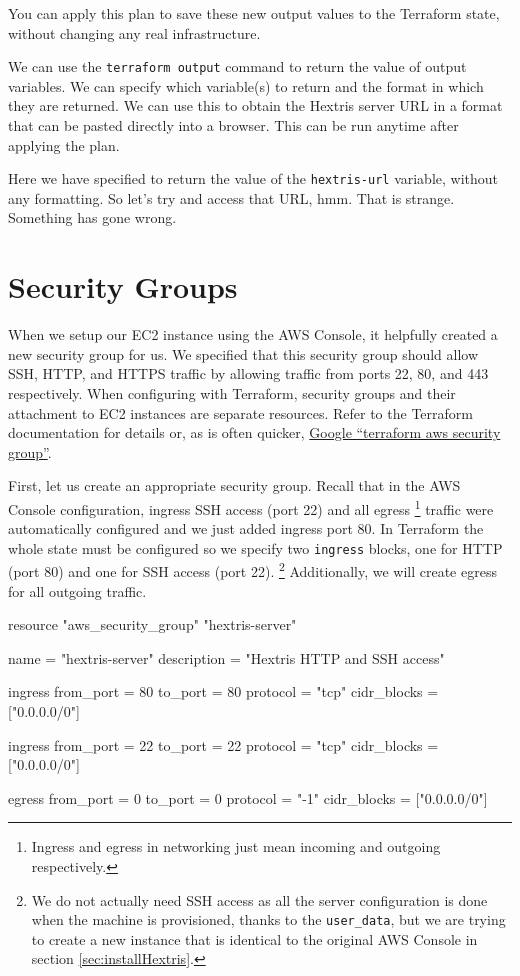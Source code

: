 \documentclass{csse4400}
\begin{document}
You can apply this plan to save these new output values to the Terraform state, without changing any real infrastructure.

We can use the \texttt{terraform output} command to return the value of output variables.
We can specify which variable(s) to return and the format in which they are returned.
We can use this to obtain the Hextris server URL in a format that can be pasted directly into a browser.
This can be run anytime after applying the plan.


Here we have specified to return the value of the \texttt{hextris-url} variable, without any formatting.
So let's try and access that URL, hmm.
That is strange. Something has gone wrong.


\section{Security Groups}
When we setup our EC2 instance using the AWS Console,
it helpfully created a new security group for us.
We specified that this security group should allow SSH, HTTP, and HTTPS traffic by allowing traffic from ports 22, 80, and 443 respectively.
When configuring with Terraform, security groups and their attachment to EC2 instances are separate resources.
Refer to the Terraform documentation for details or, as is often quicker,
\href{https://www.google.com/search?q=terraform+aws+security+group}{Google ``terraform aws security group''}.

First, let us create an appropriate security group.
Recall that in the AWS Console configuration,
ingress SSH access (port 22) and all egress%
\footnote{Ingress and egress in networking just mean incoming and outgoing respectively.}
traffic were automatically configured and we just added ingress port 80.
In Terraform the whole state must be configured so we specify two \texttt{ingress} blocks,
one for HTTP (port 80) and one for SSH access (port 22).%
\footnote{We do not actually need SSH access as all the server configuration is done when the machine is provisioned, thanks to the \texttt{user\_data},
but we are trying to create a new instance that is identical to the original AWS Console in section \ref{sec:installHextris}.}
Additionally, we will create egress for all outgoing traffic.

\begin{code}[language=terraform,numbers=none]{}
resource "aws_security_group" "hextris-server" {
  name = "hextris-server"
  description = "Hextris HTTP and SSH access"

  ingress {
    from_port = 80
    to_port = 80
    protocol = "tcp"
    cidr_blocks = ["0.0.0.0/0"]
  }

  ingress {
    from_port = 22
    to_port = 22
    protocol = "tcp"
    cidr_blocks = ["0.0.0.0/0"]
  }

  egress {
    from_port = 0
    to_port = 0
    protocol = "-1"
    cidr_blocks = ["0.0.0.0/0"]
  }
}
\end{code}
\end{document}
